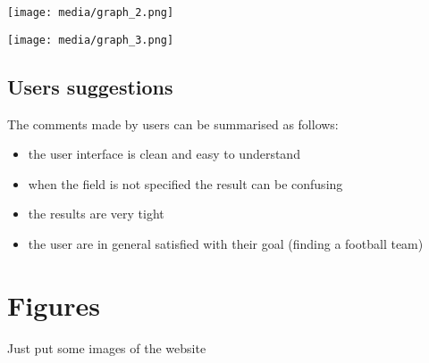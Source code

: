 \documentclass{article}
\begin{document}
\begin{center}
  \texttt{[image: media/graph\_2.png]}\\
  \label{image:image-1}
\end{center}

\begin{center}
  \texttt{[image: media/graph\_3.png]}\\
  \label{image:image-1}
\end{center}

\subsection{Users suggestions}
The comments made by users can be summarised as follows:
\begin{itemize}
    \item the user interface is clean and easy to understand
    \item when the field is not specified the result can be confusing
    \item the results are very tight
    \item the user are in general satisfied with their goal (finding a football team)
\end{itemize}

\section{Figures}
Just put some images of the website
\end{document}
